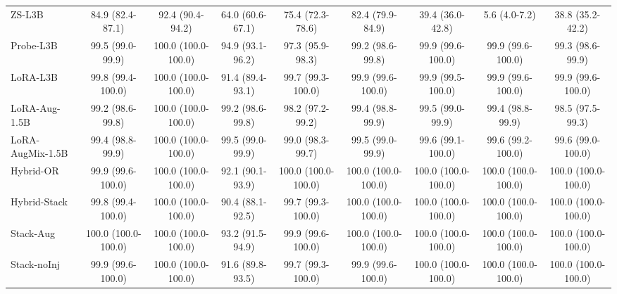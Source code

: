 \begin{table}[t]
\begin{tabular}{lcccccccc}
ZS-L3B & 84.9 (82.4-87.1) & 92.4 (90.4-94.2) & 64.0 (60.6-67.1) & 75.4 (72.3-78.6) & 82.4 (79.9-84.9) & 39.4 (36.0-42.8) & 5.6 (4.0-7.2) & 38.8 (35.2-42.2) \\
Probe-L3B & 99.5 (99.0-99.9) & 100.0 (100.0-100.0) & 94.9 (93.1-96.2) & 97.3 (95.9-98.3) & 99.2 (98.6-99.8) & 99.9 (99.6-100.0) & 99.9 (99.6-100.0) & 99.3 (98.6-99.9) \\
LoRA-L3B & 99.8 (99.4-100.0) & 100.0 (100.0-100.0) & 91.4 (89.4-93.1) & 99.7 (99.3-100.0) & 99.9 (99.6-100.0) & 99.9 (99.5-100.0) & 99.9 (99.6-100.0) & 99.9 (99.6-100.0) \\
LoRA-Aug-1.5B & 99.2 (98.6-99.8) & 100.0 (100.0-100.0) & 99.2 (98.6-99.8) & 98.2 (97.2-99.2) & 99.4 (98.8-99.9) & 99.5 (99.0-99.9) & 99.4 (98.8-99.9) & 98.5 (97.5-99.3) \\
LoRA-AugMix-1.5B & 99.4 (98.8-99.9) & 100.0 (100.0-100.0) & 99.5 (99.0-99.9) & 99.0 (98.3-99.7) & 99.5 (99.0-99.9) & 99.6 (99.1-100.0) & 99.6 (99.2-100.0) & 99.6 (99.0-100.0) \\
Hybrid-OR & 99.9 (99.6-100.0) & 100.0 (100.0-100.0) & 92.1 (90.1-93.9) & 100.0 (100.0-100.0) & 100.0 (100.0-100.0) & 100.0 (100.0-100.0) & 100.0 (100.0-100.0) & 100.0 (100.0-100.0) \\
Hybrid-Stack & 99.8 (99.4-100.0) & 100.0 (100.0-100.0) & 90.4 (88.1-92.5) & 99.7 (99.3-100.0) & 100.0 (100.0-100.0) & 100.0 (100.0-100.0) & 100.0 (100.0-100.0) & 100.0 (100.0-100.0) \\
Stack-Aug & 100.0 (100.0-100.0) & 100.0 (100.0-100.0) & 93.2 (91.5-94.9) & 99.9 (99.6-100.0) & 100.0 (100.0-100.0) & 100.0 (100.0-100.0) & 100.0 (100.0-100.0) & 100.0 (100.0-100.0) \\
Stack-noInj & 99.9 (99.6-100.0) & 100.0 (100.0-100.0) & 91.6 (89.8-93.5) & 99.7 (99.3-100.0) & 99.9 (99.6-100.0) & 100.0 (100.0-100.0) & 100.0 (100.0-100.0) & 100.0 (100.0-100.0) \\
\bottomrule
\end{tabular}
\end{table}